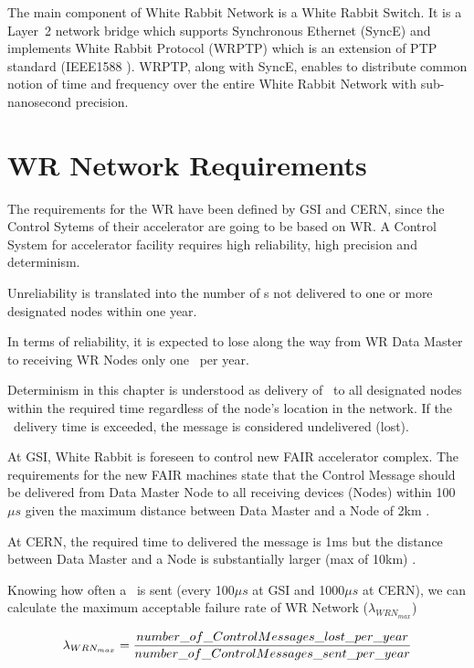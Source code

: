 The main component of White Rabbit Network is a White Rabbit Switch.
It is a Layer~2 network bridge which supports Synchronous Ethernet
(SyncE) \cite{SynchE} and implements White Rabbit Protocol (WRPTP) \cite{WRPTP}
which is an extension of PTP standard (IEEE1588 \cite{IEEE1588}). WRPTP, along
with SyncE, enables to distribute common notion of time and frequency over the
entire White Rabbit Network with sub-nanosecond precision. 

\section{WR Network Requirements} 

The requirements for the WR have been defined by GSI and CERN, since the
Control Sytems of their accelerator are going to be based on WR. A Control
System for accelerator facility requires high reliability, high precision and
determinism. 

Unreliability is translated into the number of \ControlMessage s not delivered
to one or more designated nodes within one year. 

In terms of reliability, it is expected to lose along the way from WR Data
Master to receiving WR Nodes only one \ControlMessage\ per year. 

Determinism in this chapter is understood as delivery of \ControlMessage\ to all
designated nodes within the required time regardless of the node's location in
the network. If the \ControlMessage\ delivery time is exceeded, the message is
considered undelivered (lost).

At GSI, White Rabbit is foreseen to control new FAIR accelerator complex. The
requirements for the new FAIR machines \cite{FAIRtiming} state that the Control
Message should be delivered from Data Master Node to all receiving devices
(Nodes) within 100$\mu s$ given the maximum distance between Data Master and a
Node of 2km \cite{FAIRtimingSystem}.

At CERN, the required time to delivered the message is 1ms but the distance 
between Data Master and a Node is substantially larger (max of 10km)
\cite{CERNtiming}.

Knowing how often a \ControlMessage\ is sent (every 100$\mu s$ at GSI and 
1000$\mu s$ at CERN), we can calculate the maximum acceptable failure rate
of WR Network ($\lambda_{WRN_{max}}$)

\begin{equation}
 \label{eq:failureProbability}
	\lambda_{WRN_{max}} = \frac{number\_of\_Control Message
s\_lost\_per\_year}{number\_of\_Control Message s\_sent\_per\_year}
\end{equation}


